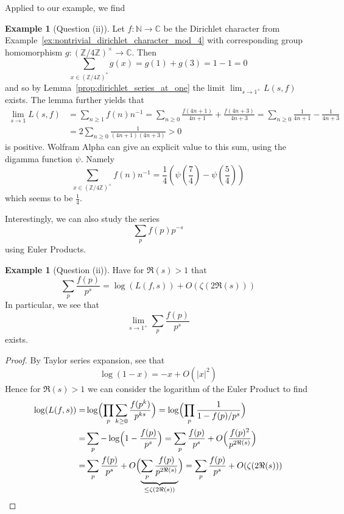 \documentclass{scrartcl}
\newcommand{\N}{\mathbb{N}}
\newcommand{\Z}{\mathbb{Z}}
\newcommand{\C}{\mathbb{C}}
\newcommand{\units}{\times}
\theoremstyle{definition}
\newtheorem{example}[definition]{Example}
\begin{document}
Applied to our example, we find
\begin{example}[Question (ii)]
    Let $f: \N \to \C$ be the Dirichlet character from Example~\ref{ex:nontrivial_dirichlet_character_mod_4} with corresponding group homomorphism $g: (\Z/4\Z)^\units \to \C$.
    Then
    \begin{equation*}
        \sum_{x \in (\Z/4\Z)^*} g(x) = g(1) + g(3) = 1 - 1 = 0
    \end{equation*}
    and so by Lemma~\ref{prop:dirichlet_series_at_one} the limit $\lim_{s \to 1^+} L(s, f)$ exists.
    The lemma further yields that
    \begin{align*}
        \lim_{s \to 1} L(s, f) &= \sum_{n \geq 1} f(n) n^{-1} = \sum_{n \geq 0} \frac {f(4n + 1)} {4n + 1} + \frac {f(4n + 3)} {4n + 3} = \sum_{n \geq 0} \frac 1 {4n + 1} - \frac 1 {4n + 3} \\
        &= 2 \sum_{n \geq 0} \frac 1 {(4n + 1)(4n + 3)} > 0
    \end{align*}
    is positive. 
    Wolfram Alpha \cite{wolfram_alpha} can give an explicit value to this sum, using the digamma function $\psi$. Namely
    \begin{equation*}
        \sum_{x \in (\Z/4\Z)^\units} f(n) n^{-1} = \frac 1 4 (\psi(\frac 7 4) - \psi(\frac 5 4))
    \end{equation*}
    which seems to be $\frac 1 4$.
\end{example}
Interestingly, we can also study the series
\begin{equation*}
    \sum_p f(p) p^{-s}
\end{equation*}
using Euler Products.
\begin{example}[Question (ii)]
    \label{ex:dirichlet_sum_over_primes}
    Have for $\Re(s) > 1$ that
    \begin{equation*}
        \sum_p \frac {f(p)} {p^s} = \log( L(f, s) ) + O( \zeta(2\Re(s)) )
    \end{equation*}
    In particular, we see that
    \begin{equation*}
        \lim_{s \to 1^+} \sum_p \frac {f(p)} {p^s}
    \end{equation*}
    exists.
\end{example}
\begin{proof}
    By Taylor series expansion, see that
    \begin{equation*}
        \log(1 - x) = -x + O(|x|^2)
    \end{equation*}
    Hence for $\Re(s) > 1$ we can consider the logarithm of the Euler Product to find
    \begin{align*}
        \log( L(f, s) ) =& \log\Bigl( \prod_p \sum_{k \geq 0} \frac {f(p^k)} {p^{ks}} \Bigr) = \log\Bigl( \prod_p \frac 1 {1 - f(p)/p^s} \Bigr) \\
        =& \sum_p -\log\Bigl( 1 - \frac {f(p)} {p^s} \Bigr) = \sum_p \frac {f(p)} {p^s} + O\Bigl( \frac {f(p)^2} {p^{2\Re(s)}} \Bigr) \\
        = & \sum_p \frac {f(p)} {p^s} + O\Bigl( \underbrace{\sum_p \frac {f(p)} {p^{2\Re(s)}}}_{\leq \zeta(2\Re(s))} \Bigr) = \sum_p \frac {f(p)} {p^s} + O(\zeta(2\Re(s)))
    \end{align*}
\end{proof}
\end{document}
